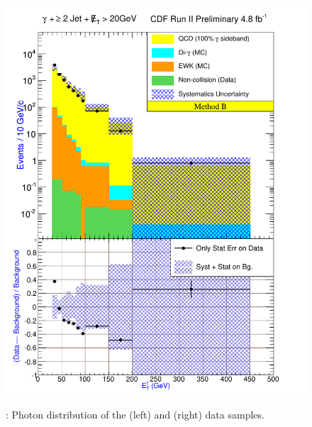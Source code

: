 \documentclass[11pt]{article}
\begin{document}
\begin{figure}[h!]
{ \includegraphics[scale=\resultsHistScale,keepaspectratio=true]{./g30jetmet20_MtdB_plot2_Et_pho.pdf}
}

 \caption{: Photon \et distribution of the \phoonejetmettwenty (left) and \photwojetmettwenty (right) data samples.}
 \label{fig:Result_MtdB_gj1Met20_PhoEt}
\end{figure}
\end{document}

